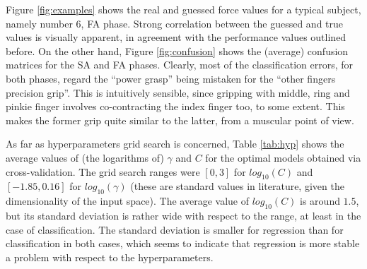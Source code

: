 \documentclass[10pt]{bmc_article}
\def\texttt{[image: ]}
\newenvironment{bmcformat}
  {\begin{raggedright}\baselineskip20pt\sloppy\setboolean{publ}{false}}
  {\end{raggedright}\baselineskip20pt\sloppy}
\begin{document}
\begin{bmcformat}
Figure \ref{fig:examples} shows the real and guessed force values for a
typical subject, namely number $6$, FA phase. Strong correlation between
the guessed and true values is visually apparent, in agreement with the
performance values outlined before.
On the other hand, Figure \ref{fig:confusion} shows the (average)
confusion matrices for the SA and FA phases. Clearly, most of the classification
errors, for both phases, regard the ``power grasp'' being mistaken for the
``other fingers precision grip''. This is intuitively sensible, since gripping
with middle, ring and pinkie finger involves co-contracting the index finger too,
to some extent.
This makes the former grip quite similar to the latter, from a muscular point
of view.



As far as hyperparameters grid search is concerned,
Table \ref{tab:hyp} shows the average values of (the logarithms of)
$\gamma$ and $C$ for the optimal models obtained via cross-validation.
The grid search ranges were $[0,3]$ for $log_{10}(C)$ and
$[-1.85,0.16]$ for $log_{10}(\gamma)$ (these are standard values in
literature, given the dimensionality of the input space). The average value of
$log_{10}(C)$ is around $1.5$, but its standard deviation is rather wide
with respect to the range, at least in the case of
classification. The standard deviation is smaller for regression than
for classification in both cases, which seems to indicate that
regression is more stable a problem with respect to the
hyperparameters.


\end{bmcformat}
\end{document}
